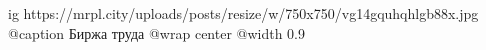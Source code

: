  
 
 
 
 

\ifcmt
  ig https://mrpl.city/uploads/posts/resize/w/750x750/vg14gquhqhlgb88x.jpg
	@caption Биржа труда
  @wrap center
  @width 0.9
\fi
